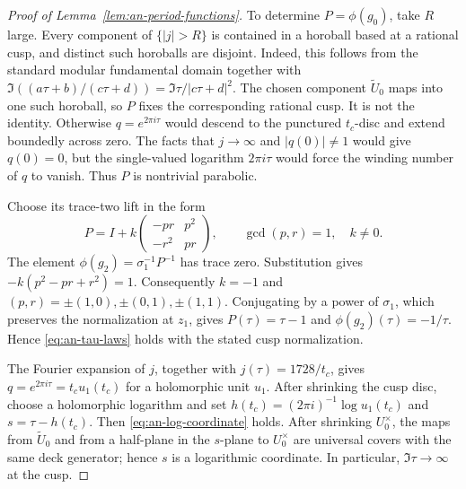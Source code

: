 \documentclass[11pt]{article}
\theoremstyle{definition}
\theoremstyle{remark}
\numberwithin{equation}{section}
\begin{document}
\begin{proof}[Proof of Lemma~\ref{lem:an-period-functions}]
To determine $P=\phi(g_0)$, take $R$ large.  Every component
of $\{|j|>R\}$ is contained in a horoball based at a rational cusp, and
distinct such horoballs are disjoint.  Indeed, this follows from the
standard modular fundamental domain together with
$\Im((a\tau+b)/(c\tau+d))=\Im\tau/|c\tau+d|^2$.
The chosen component $\widetilde U_0$ maps into one such horoball, so $P$
fixes the corresponding rational cusp.  It is not the identity.  Otherwise
$q=e^{2\pi i\tau}$ would descend to the punctured $t_c$-disc and
extend boundedly across zero.  The facts that $j\to\infty$ and
$|q(0)|\ne1$ would give $q(0)=0$, but the single-valued logarithm
$2\pi i\tau$ would force the winding number of $q$ to vanish.  Thus
$P$ is nontrivial parabolic.

Choose its trace-two lift in the form
\[
 P=I+k
 \begin{pmatrix}
 -pr&p^2\\-r^2&pr
 \end{pmatrix},
 \qquad \gcd(p,r)=1,\quad k\ne0.
\]
The element $\phi(g_2)=\sigma_1^{-1}P^{-1}$ has trace zero.  Substitution
gives $-k(p^2-pr+r^2)=1$.
Consequently $k=-1$ and
$(p,r)=\pm(1,0),\pm(0,1),\pm(1,1)$.  Conjugating by a power of $\sigma_1$,
which preserves the normalization at $z_1$, gives
$P(\tau)=\tau-1$ and $\phi(g_2)(\tau)=-1/\tau$.
Hence \eqref{eq:an-tau-laws} holds with the stated cusp normalization.

The Fourier expansion of $j$, together with
$j(\tau)=1728/t_c$, gives $q=e^{2\pi i\tau}=t_cu_1(t_c)$
for a holomorphic unit $u_1$.  After shrinking the cusp disc, choose a
holomorphic logarithm and set
$h(t_c)=(2\pi i)^{-1}\log u_1(t_c)$ and $s=\tau-h(t_c)$.
Then \eqref{eq:an-log-coordinate} holds.  After shrinking $U_0^\times$, the
maps from $\widetilde U_0$ and from a half-plane in the $s$-plane to
$U_0^\times$ are universal covers with the same deck generator; hence
$s$ is a logarithmic coordinate.  In particular,
$\Im\tau\to\infty$ at the cusp.


\end{proof}
\end{document}
